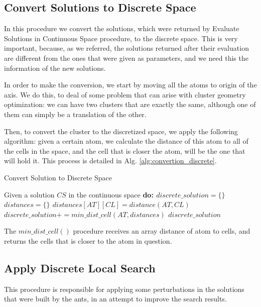 			\subsection{Convert Solutions to Discrete Space}
			In this procedure we convert the solutions, which were returned by Evaluate Solutions in Continuous Space procedure, to the discrete space. This is very important, because, as we referred, the solutions returned after their evaluation are different from the ones that were given as parameters, and we need this the information of the new solutions.

			In order to make the conversion, we start by moving all the atoms to origin of the axis. We do this, to deal of some problem that can arise with cluster geometry optimization: we can have two clusters that are exactly the same, although one of them can simply be a translation of the other.

			Then, to convert the cluster to the discretized space, we apply the following algorithm: given a certain atom, we calculate the distance of this atom to all of the cells in the space, and the cell that is closer the atom, will be the one that will hold it. This process is detailed in Alg. \ref{alg:convertion_discrete}.
			
			\begin{algorithm}
				\caption{Convert Solution to Discrete Space}
				\label{alg:convertion_discrete}
				\begin{algorithmic}
				\STATE Given a solution $CS$ in the continuous space \bf{do}:
				\STATE $discrete\_solution = \{\}$
						\STATE $distances = \{\}$
								\STATE $distances[AT][CL] = distance(AT, CL)$
						\ENDFOR
						\STATE $discrete\_solution += min\_dist\_cell(AT, distances)$
				\ENDFOR
				\RETURN $discrete\_solution$
				\end{algorithmic}
			\end{algorithm}
			
			The $min\_dist\_cell()$ procedure receives an array distance of atom to cells, and returns the cells that is closer to the atom in question.
			
			\subsection{Apply Discrete Local Search}
			This procedure is responsible for applying some perturbations in the solutions that were built by the ants, in an attempt to improve the search results.


